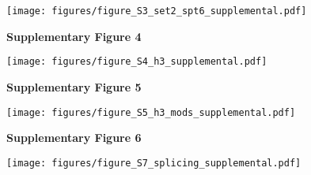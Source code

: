 \documentclass[9pt, letterpaper]{extarticle}
\begin{document}
{\centering \texttt{[image: figures/figure\_S3\_set2\_spt6\_supplemental.pdf]}\par}

\newpage

\textbf{\large Supplementary Figure 4}

{\centering \texttt{[image: figures/figure\_S4\_h3\_supplemental.pdf]}\par}

\newpage

\textbf{\large Supplementary Figure 5}

{\centering \texttt{[image: figures/figure\_S5\_h3\_mods\_supplemental.pdf]}\par}

\newpage




\textbf{\large Supplementary Figure 6}

{\centering \texttt{[image: figures/figure\_S7\_splicing\_supplemental.pdf]}\par}

\newpage
\end{document}
